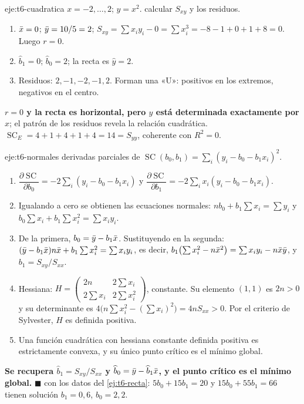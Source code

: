 \begin{solucion}{eje:t6-cuadratica}
\datos $x=-2,\dots,2$; $y=x^{2}$.
\planteamiento calcular $S_{xy}$ y los residuos.
\pasos
\begin{enumerate}[label=\arabic*.]
  \item $\bar{x}=0$; $\bar{y}=10/5=2$; $S_{xy}=\sum x_iy_i-0=\sum x_i^{3}=-8-1+0+1+8=0$. Luego $r=0$.
  \item $\widehat b_1=0$; $\widehat b_0=2$; la recta es $\widehat y=2$.
  \item Residuos: $2,-1,-2,-1,2$. Forman una «U»: positivos en los extremos, negativos en el centro.
\end{enumerate}
\resultado \textbf{$r=0$ y la recta es horizontal, pero $y$ está determinada exactamente por $x$}; el patrón de los residuos revela la relación cuadrática.
\comprobacion $\operatorname{SC}_E=4+1+4+1+4=14=S_{yy}$, coherente con $R^{2}=0$.
\end{solucion}

\begin{solucion}{eje:t6-normales}
\planteamiento derivadas parciales de $\operatorname{SC}(b_0,b_1)=\sum_i(y_i-b_0-b_1x_i)^{2}$.
\pasos
\begin{enumerate}[label=\arabic*.]
  \item $\dfrac{\partial\operatorname{SC}}{\partial b_0}=-2\sum_i(y_i-b_0-b_1x_i)$ y $\dfrac{\partial\operatorname{SC}}{\partial b_1}=-2\sum_ix_i(y_i-b_0-b_1x_i)$.
  \item Igualando a cero se obtienen las ecuaciones normales: $nb_0+b_1\sum x_i=\sum y_i$ y $b_0\sum x_i+b_1\sum x_i^{2}=\sum x_iy_i$.
  \item De la primera, $b_0=\bar{y}-b_1\bar{x}$. Sustituyendo en la segunda: $(\bar{y}-b_1\bar{x})n\bar{x}+b_1\sum x_i^{2}=\sum x_iy_i$, es decir, $b_1\bigl(\sum x_i^{2}-n\bar{x}^{2}\bigr)=\sum x_iy_i-n\bar{x}\bar{y}$, y $b_1=S_{xy}/S_{xx}$.
  \item Hessiana: $H=\begin{pmatrix}2n&2\sum x_i\\2\sum x_i&2\sum x_i^{2}\end{pmatrix}$, constante. Su elemento $(1,1)$ es $2n>0$ y su determinante es $4\bigl(n\sum x_i^{2}-(\sum x_i)^{2}\bigr)=4nS_{xx}>0$. Por el criterio de Sylvester, $H$ es definida positiva.
  \item Una función cuadrática con hessiana constante definida positiva es estrictamente convexa, y su único punto crítico es el mínimo global.
\end{enumerate}
\resultado \textbf{Se recupera $\widehat b_1=S_{xy}/S_{xx}$ y $\widehat b_0=\bar{y}-\widehat b_1\bar{x}$, y el punto crítico es el mínimo global.} $\blacksquare$
\comprobacion con los datos del \cref{ej:t6-recta}: $5b_0+15b_1=20$ y $15b_0+55b_1=66$ tienen solución $b_1=0{,}6$, $b_0=2{,}2$.
\end{solucion}

